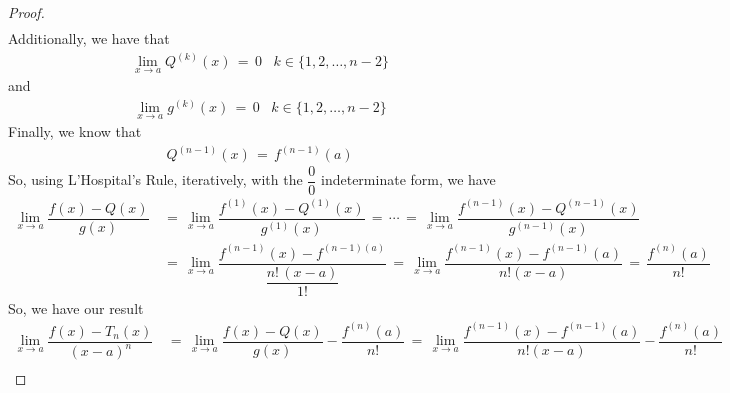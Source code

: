 \begin{theorem}
\begin{proof}
\begin{align*}
        \end{align*}
        Additionally, we have that
        \begin{align*}
            \lim_{x \longrightarrow a} Q^{(k)}(x) \hspace{2pt} = \hspace{2pt} 0 \hspace{10pt} k \in \{1, 2, \dots , n-2\}
        \end{align*}
        and
        \begin{align*}
            \lim_{x \longrightarrow a} g^{(k)}(x) \hspace{2pt} = \hspace{2pt} 0 \hspace{10pt} k \in \{1, 2, \dots , n-2\}
        \end{align*}
        Finally, we know that 
        \begin{align*}
            Q^{(n-1)}(x) \hspace{2pt} = \hspace{2pt} f^{(n-1)}(a)
        \end{align*}
        So, using L'Hospital's Rule, iteratively, with the $\dfrac{0}{0}$ indeterminate form, we have
        \begin{align*}
            \lim_{x \longrightarrow a} \dfrac{f(x) - Q(x)}{g(x)} \hspace{2pt} &= \hspace{2pt} \lim_{x \longrightarrow a} \dfrac{f^{(1)}(x) - Q^{(1)}(x)}{g^{(1)}(x)} \hspace{2pt} = \hspace{2pt} \cdots \hspace{2pt} = \hspace{2pt} \lim_{x \longrightarrow a} \dfrac{f^{(n-1)}(x) - Q^{(n-1)}(x)}{g^{(n-1)}(x)} \\[2ex]
            &= \hspace{2pt} \lim_{x \longrightarrow a} \dfrac{f^{(n-1)}(x) - f^{(n-1)(a)}}{\dfrac{n! \hspace{2pt} (x - a)}{1!}} \hspace{2pt} = \hspace{2pt} \lim_{x \longrightarrow a} \dfrac{f^{(n-1)}(x) - f^{(n-1)}(a)}{n! (x - a)} \hspace{2pt} = \hspace{2pt} \dfrac{f^{(n)}(a)}{n!}
        \end{align*}
        So, we have our result
        \begin{align*}
            \lim_{x \longrightarrow a} \dfrac{f(x) - T_{n}(x)}{(x-a)^{n}} \hspace{2pt} &= \hspace{2pt} \lim_{x \longrightarrow a} \dfrac{f(x) - Q(x)}{g(x)} - \dfrac{f^{(n)}(a)}{n!} \hspace{2pt} = \hspace{2pt} \lim_{x \longrightarrow a} \dfrac{f^{(n-1)}(x) - f^{(n-1)}(a)}{n!(x - a)} - \dfrac{f^{(n)}(a)}{n!} \\[2ex]

\end{align*}
\end{proof}
\end{theorem}
